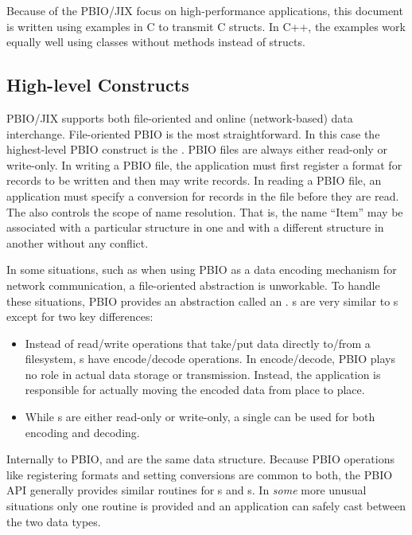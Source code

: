 Because of the PBIO/JIX focus on high-performance applications, this document
is written using examples in C to transmit C structs.  In C++, the examples
work equally well using classes without methods instead of structs.

\subsection{High-level Constructs}
PBIO/JIX supports both file-oriented and online (network-based) data
interchange.  File-oriented PBIO is the most straightforward.  In this case
the highest-level PBIO construct is the .  PBIO files are always
either read-only or write-only.  In writing a PBIO file, the application must
first register a format for records to be written and then may write records. 
In reading a PBIO file, an application must specify a conversion for records
in the file before they are read.  The  also controls the scope of
name resolution.  That is, the name ``Item'' may be associated with a
particular structure in one  and with a different structure in another
 without any conflict.

In some situations, such as when using PBIO as a data encoding mechanism for
network communication, a file-oriented abstraction is unworkable.  To handle
these situations, PBIO provides an abstraction called an .
s are very similar to s except for two key differences:
\begin{itemize}
\item Instead of  read/write operations that take/put data directly
to/from a filesystem, s have encode/decode operations.  In
encode/decode, PBIO plays no role in actual data storage or transmission.
Instead, the application is responsible for actually moving the encoded data
from place to place.
\item While s are either read-only or write-only, a single 
can be used for both encoding and decoding.
\end{itemize}

Internally to PBIO,  and  are the same data structure.
Because PBIO operations like registering formats and setting conversions are
common to both, the PBIO API generally provides similar routines for
s and s.  In {\it some} more unusual situations only one
routine is provided and an application can safely cast between the two data
types.

